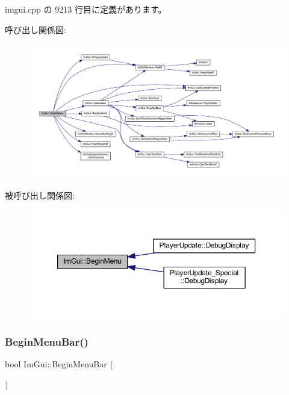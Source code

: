  imgui.\+cpp の 9213 行目に定義があります。

呼び出し関係図\+:\nopagebreak
\begin{figure}[H]
\begin{center}
\leavevmode
\includegraphics[width=350pt]{namespace_im_gui_a1e55711a21f97d5dff919d697d3a7201_cgraph}
\end{center}
\end{figure}
被呼び出し関係図\+:\nopagebreak
\begin{figure}[H]
\begin{center}
\leavevmode
\includegraphics[width=350pt]{namespace_im_gui_a1e55711a21f97d5dff919d697d3a7201_icgraph}
\end{center}
\end{figure}
\mbox{\label{namespace_im_gui_a4852dff802922163fc747e2e0df5b88f}} 
\subsubsection{\texorpdfstring{Begin\+Menu\+Bar()}{BeginMenuBar()}}
{\footnotesize\ttfamily bool Im\+Gui\+::\+Begin\+Menu\+Bar (\begin{DoxyParamCaption}{ }\end{DoxyParamCaption})}



